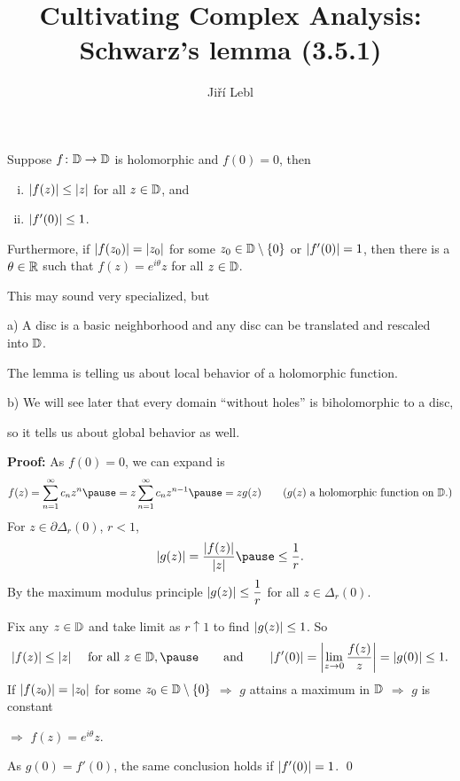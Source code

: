 \documentclass[10pt,aspectratio=169]{beamer}
\author{Ji\v{r}\'i Lebl}
\institute[OSU]{%
Departemento pri Matematiko de Oklahoma {\^S}tata Universitato}
\title{Cultivating Complex Analysis:\\%
Schwarz's lemma (3.5.1)}
\date{}
\begin{document}
\begin{frame}
\titlepage
\end{frame}

\begin{frame}
\begin{lemma}
Suppose $f \colon {\mathbb{D}} \to {\mathbb{D}}$ is holomorphic and $f(0) = 0$,
then 
\pause
\begin{enumerate}[(i)]
\item $\lvert {f(z)} \rvert \leq \lvert {z} \rvert$ for all $z \in {\mathbb{D}}$, and
\pause
\item $\lvert {f'(0)} \rvert \leq 1$.
\end{enumerate}
\pause
Furthermore, if $\lvert {f(z_0)} \rvert = \lvert {z_0} \rvert$ for some $z_0 \in {\mathbb{D}} \setminus
\{ 0 \}$
or $\lvert {f'(0)} \rvert = 1$, then
there is a $\theta \in {\mathbb{R}}$ such that $f(z) =
e^{i\theta} z$ for all $z \in {\mathbb{D}}$.
\end{lemma}

\pause

This may sound very specialized, but

\pause
\medskip

a) A disc is a basic neighborhood and any disc can be translated and rescaled
into ${\mathbb{D}}$. \pause

The lemma is telling us about local behavior of a holomorphic function.

\pause
\medskip

b) We will see later that every domain ``without holes'' is biholomorphic to a
disc,

so it tells us about global behavior as well.

\end{frame}

\begin{frame}
\textbf{Proof:}
As $f(0) = 0$, we can expand is
\[
f(z) = \sum_{n=1}^\infty c_n z^n \pause = z \sum_{n=1}^\infty c_n z^{n-1}
\pause = z g(z) \qquad \text{($g(z)$ a holomorphic function on $\D$.)}
\]
\pause
For $z \in \partial \Delta_r(0)$, $r < 1$,
\[
\sabs{g(z)} = \frac{\sabs{f(z)}}{\sabs{z}} \pause \leq \frac{1}{r} .
\]
\pause
By the maximum modulus principle
$\lvert {g(z)} \rvert \leq \dfrac{1}{r}$ for all $z \in \Delta_r(0)$.

\pause
\medskip

Fix any $z \in {\mathbb{D}}$ and take limit as $r \uparrow 1$ to find
$\lvert {g(z)} \rvert \leq 1$.
\pause
So
\[
\sabs{f(z)} \leq \sabs{z} \quad \text{ for all } z \in \D,
\pause \qquad \text{and} \qquad
\abs{f'(0)}
=
\abs{\lim_{z \to 0} \frac{f(z)}{z}} = \sabs{g(0)} \leq 1 .
\]
\pause
If $\lvert {f(z_0)} \rvert = \lvert {z_0} \rvert$ for some $z_0 \in {\mathbb{D}} \setminus \{ 0 \}$
\pause $\Rightarrow$
$g$ attains a maximum in ${\mathbb{D}}$
\pause $\Rightarrow$
$g$ is constant

\pause $\Rightarrow$ $f(z) = e^{i \theta} z$.

\medskip
\pause

As $g(0) = f'(0)$, the same conclusion holds if $\lvert {f'(0)} \rvert = 1$.
\qed
\end{frame}
\end{document}
